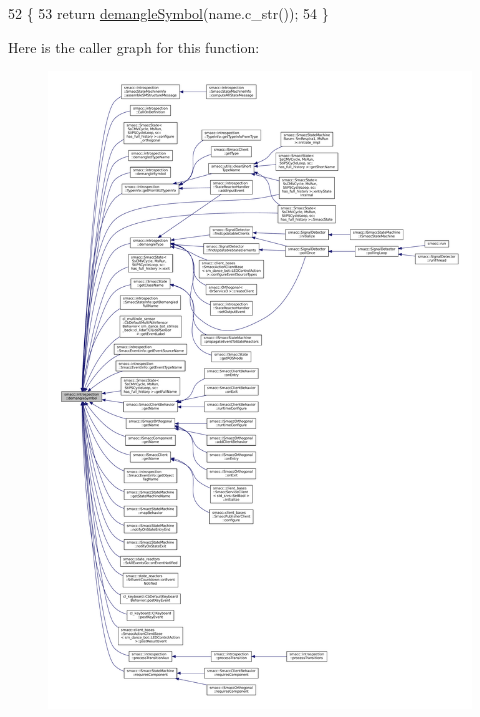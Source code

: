 \begin{DoxyCode}
52 \{
53     \textcolor{keywordflow}{return} \hyperlink{namespacesmacc_1_1introspection_aa9158a0ff0cfe83a59877e6af7d7f873}{demangleSymbol}(name.c\_str());
54 \}
\end{DoxyCode}
Here is the caller graph for this function\+:
\nopagebreak
\begin{figure}[H]
\begin{center}
\leavevmode
\includegraphics[width=350pt]{namespacesmacc_1_1introspection_a2f495108db3e57604d8d3ff5ef030302_icgraph}
\end{center}
\end{figure}
\mbox{\label{namespacesmacc_1_1introspection_af32c671351d958213f8031bb90767922}} 
